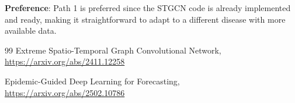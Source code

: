 \documentclass[12pt,a4paper]{article}
\begin{document}
\textbf{Preference}: Path 1 is preferred since the STGCN code is already implemented and ready, making it straightforward to adapt to a different disease with more available data.

\begin{thebibliography}{99}
Extreme Spatio-Temporal Graph Convolutional Network, \url{https://arxiv.org/abs/2411.12258}

Epidemic-Guided Deep Learning for Forecasting, \url{https://arxiv.org/abs/2502.10786}
\end{thebibliography}
\end{document}
